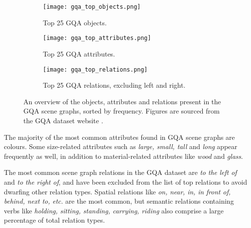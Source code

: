 \begin{figure}[htbp]
    \centering
    \begin{subfigure}[l]{0.33\textwidth}
        \texttt{[image: gqa\_top\_objects.png]}
        \label{fig:gqa_top_objects}
        \caption{Top 25 GQA objects.}
    \end{subfigure}
    \begin{subfigure}[c]{0.32\textwidth}
        \texttt{[image: gqa\_top\_attributes.png]}
        \label{fig:gqa_top_attributes}
        \caption{Top 25 GQA attributes.}
    \end{subfigure}
    \begin{subfigure}[r]{0.33\textwidth}
        \texttt{[image: gqa\_top\_relations.png]}
        \label{fig:gqa_top_relations}
        \caption{Top 25 GQA relations, excluding left and right.}
    \end{subfigure}
    \caption[An overview of GQA object, attribute and relation distributions.]{An overview of the objects, attributes and relations present in the GQA scene graphs, sorted by frequency. Figures are sourced from the GQA dataset website \cite{hudson2019gqa_website}.}
    \label{fig:gqa_scene_graph_object_relation_attribute_distribution}
\end{figure}

The majority of the most common attributes found in GQA scene graphs are colours. Some size-related attributes such as \textit{large, small, tall} and \textit{long} appear frequently as well, in addition to material-related attributes like \textit{wood} and \textit{glass}.

The most common scene graph relations in the GQA dataset are \textit{to the left of} and \textit{to the right of}, and have been excluded from the list of top relations to avoid dwarfing other relation types. Spatial relations like \textit{on, near, in, in front of, behind, next to, etc.} are the most common, but semantic relations containing verbs like \textit{holding, sitting, standing, carrying, riding} also comprise a large percentage of total relation types.

